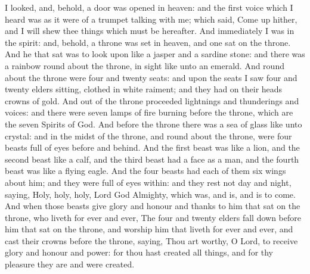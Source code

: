  I looked, and, behold, a door was opened in heaven: and the first voice which I heard was as it were of a trumpet talking with me; which said, Come up hither, and I will shew thee things which must be hereafter. And immediately I was in the spirit: and, behold, a throne was set in heaven, and one sat on the throne. And he that sat was to look upon like a jasper and a sardine stone: and there was a rainbow round about the throne, in sight like unto an emerald. And round about the throne were four and twenty seats: and upon the seats I saw four and twenty elders sitting, clothed in white raiment; and they had on their heads crowns of gold. And out of the throne proceeded lightnings and thunderings and voices: and there were seven lamps of fire burning before the throne, which are the seven Spirits of God. And before the throne there was a sea of glass like unto crystal: and in the midst of the throne, and round about the throne, were four beasts full of eyes before and behind. And the first beast was like a lion, and the second beast like a calf, and the third beast had a face as a man, and the fourth beast was like a flying eagle. And the four beasts had each of them six wings about him; and they were full of eyes within: and they rest not day and night, saying, Holy, holy, holy, Lord God Almighty, which was, and is, and is to come. And when those beasts give glory and honour and thanks to him that sat on the throne, who liveth for ever and ever, The four and twenty elders fall down before him that sat on the throne, and worship him that liveth for ever and ever, and cast their crowns before the throne, saying, Thou art worthy, O Lord, to receive glory and honour and power: for thou hast created all things, and for thy pleasure they are and were created.


